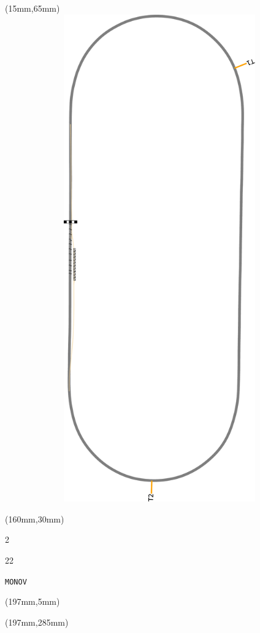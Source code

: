 \begin{textblock*}{185mm}(15mm,65mm)%
\centering
\mbox{\includegraphics[width=185mm,height=210mm,keepaspectratio]{PT/MONOV.pdf}}
\end{textblock*}
\begin{textblock*}{40mm}(160mm,30mm)%
\Large
\par{} 
\par2 
\par22 
\par\hfill\tiny\tt MONOV\\
\end{textblock*}
\begin{textblock*}{20mm}(197mm,5mm)%
\fbox{\thepage}
\label{MONOV}
\end{textblock*}
\begin{textblock*}{20mm}(197mm,285mm)%
\fbox{\thepage}
\end{textblock*}

